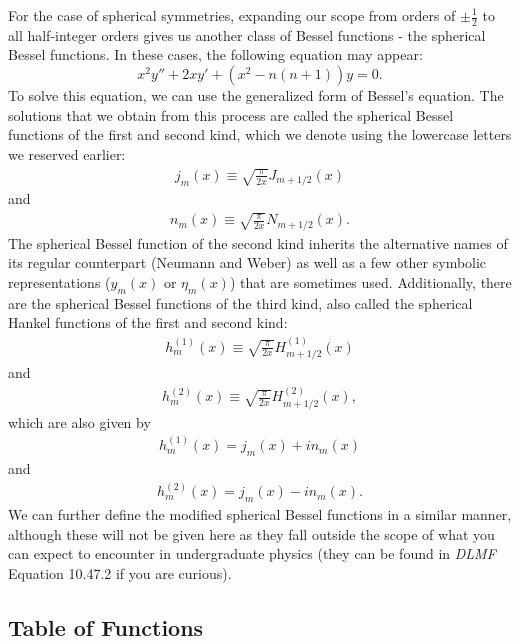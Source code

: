 \documentclass[11pt]{report}
\begin{document}
For the case of spherical symmetries, expanding our scope from orders of $\pm\frac{1}{2}$ to all half-integer orders gives us another class of Bessel functions - the spherical Bessel functions. In these cases, the following equation may appear:
    \begin{equation*}
         x^2y''+2xy'+(x^2-n(n+1))y = 0.
    \end{equation*}
To solve this equation, we can use the generalized form of Bessel's equation. The solutions that we obtain from this process are called the spherical Bessel functions of the first and second kind, which we denote using the lowercase letters we reserved earlier:
    \begin{align}
        j_m(x) \equiv \sqrt{\frac{\pi}{2x}}J_{m+1/2}(x)
    \end{align}
and
    \begin{align}
        n_m(x) \equiv \sqrt{\frac{\pi}{2x}}N_{m+1/2}(x).
    \end{align}
The spherical Bessel function of the second kind inherits the alternative names of its regular counterpart (Neumann and Weber) as well as a few other symbolic representations ($y_m(x)$ or $\eta_m(x)$) that are sometimes used. Additionally, there are the spherical Bessel functions of the third kind, also called the spherical Hankel functions of the first and second kind:
    \begin{align}
        h_m^{(1)}(x) \equiv \sqrt{\frac{\pi}{2x}}H_{m+1/2}^{(1)}(x)
    \end{align}
and
    \begin{align}
        h_m^{(2)}(x) \equiv \sqrt{\frac{\pi}{2x}}H_{m+1/2}^{(2)}(x),
    \end{align}
which are also given by
    \begin{align*}
        h_m^{(1)}(x) = j_m(x) + in_m(x)
    \end{align*}
and
    \begin{align*}
        h_m^{(2)}(x) = j_m(x) - in_m(x).
    \end{align*}
We can further define the modified spherical Bessel functions in a similar manner, although these will not be given here as they fall outside the scope of what you can expect to encounter in undergraduate physics (they can be found in \emph{DLMF} Equation 10.47.2 if you are curious).

\subsection{Table of Functions}
\end{document}
